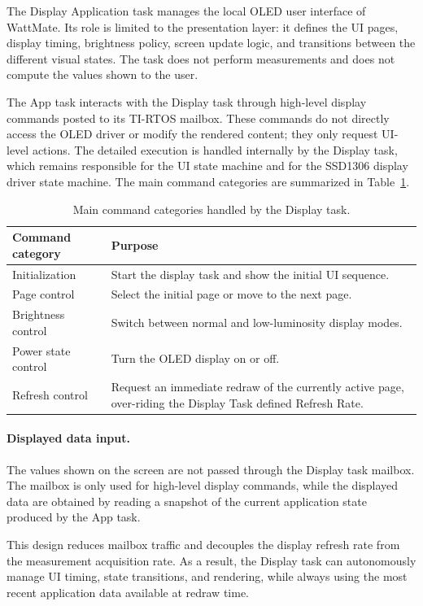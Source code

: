 The Display Application task manages the local OLED user interface of WattMate. Its role is limited to the presentation layer: it defines the UI pages, display timing, brightness policy, screen update logic, and transitions between the different visual states. The task does not perform measurements and does not compute the values shown to the user.

The App task interacts with the Display task through high-level display commands posted to its TI-RTOS mailbox. These commands do not directly access the OLED driver or modify the rendered content; they only request UI-level actions. The detailed execution is handled internally by the Display task, which remains responsible for the UI state machine and for the SSD1306 display driver state machine. The main command categories are summarized in Table~\ref{tab:display_commands}.

\begin{table}[H]
	\centering
	\small
	\caption{Main command categories handled by the Display task.}
	\label{tab:display_commands}
	\begin{tabularx}{\textwidth}{lX}
		\toprule
		\textbf{Command category} & \textbf{Purpose} \\
		\midrule
		Initialization		& Start the display task and show the initial UI sequence. \\
		Page control		& Select the initial page or move to the next page. \\
		Brightness control	& Switch between normal and low-luminosity display modes. \\
		Power state control	& Turn the OLED display on or off. \\
		Refresh control		& Request an immediate redraw of the currently active page, over-riding the Display Task defined Refresh Rate. \\
		\bottomrule
	\end{tabularx}
\end{table}

\paragraph{Displayed data input.}
The values shown on the screen are not passed through the Display task mailbox. The mailbox is only used for high-level display commands, while the displayed data are obtained by reading a snapshot of the current application state produced by the App task.

This design reduces mailbox traffic and decouples the display refresh rate from the measurement acquisition rate. As a result, the Display task can autonomously manage UI timing, state transitions, and rendering, while always using the most recent application data available at redraw time.

